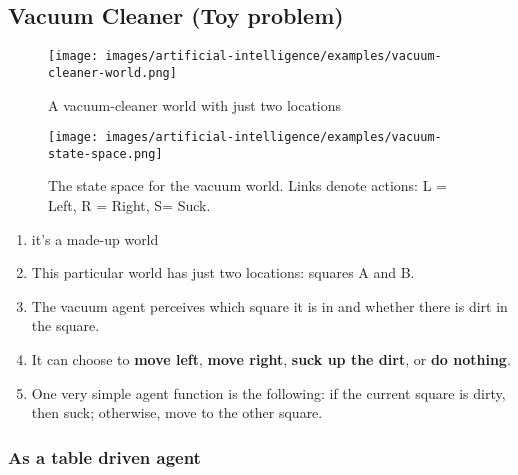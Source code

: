 \subsection{Vacuum Cleaner (Toy problem) \cite{ai/book/Artificial-Intelligence-A-Modern-Approach/Russell-Norvig}}


\begin{figure}[H]
    \centering
    \texttt{[image: images/artificial-intelligence/examples/vacuum-cleaner-world.png]}
    \caption*{A vacuum-cleaner world with just two locations}
\end{figure}

\begin{figure}[H]
    \centering
    \texttt{[image: images/artificial-intelligence/examples/vacuum-state-space.png]}
    \caption*{The state space for the vacuum world. Links denote actions: L = Left, R = Right, S= Suck. \cite{ai/book/Artificial-Intelligence-A-Modern-Approach/Russell-Norvig}}
\end{figure}



\vspace{0.5cm}

\begin{enumerate}[itemsep=0.2cm]
    \item it’s a made-up world

    \item This particular world has just two locations: squares A and B. 
    
    \item The vacuum agent perceives which square it is in and whether there is dirt in the square. 
    
    \item It can choose to \textbf{move left}, \textbf{move right}, \textbf{suck up the dirt}, or \textbf{do nothing}.

    \item One very simple agent function is the following: if the current square is dirty, then suck; otherwise, move to the other square.

    
\end{enumerate}



\subsubsection{As a table driven agent}

